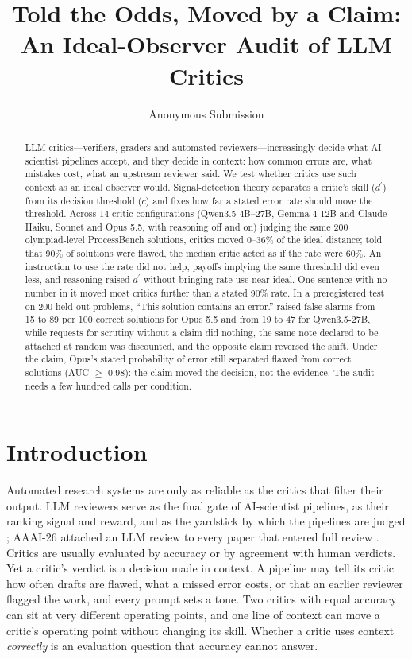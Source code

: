 \documentclass[letterpaper]{article} %
\title{Told the Odds, Moved by a Claim:\\An Ideal-Observer Audit of LLM Critics}
\author{Anonymous Submission}
\newcommand{\dprime}{d^{\prime}}
\begin{document}
\maketitle

\begin{abstract}
LLM critics---verifiers, graders and automated reviewers---increasingly decide what AI-scientist pipelines accept, and they decide in context: how common errors are, what mistakes cost, what an upstream reviewer said. We test whether critics use such context as an ideal observer would. Signal-detection theory separates a critic's skill ($\dprime$) from its decision threshold ($c$) and fixes how far a stated error rate should move the threshold. Across 14 critic configurations (Qwen3.5 4B--27B, Gemma-4-12B and Claude Haiku, Sonnet and Opus 5.5, with reasoning off and on) judging the same 200 olympiad-level ProcessBench solutions, critics moved 0--36\% of the ideal distance; told that 90\% of solutions were flawed, the median critic acted as if the rate were 60\%. An instruction to use the rate did not help, payoffs implying the same threshold did even less, and reasoning raised $\dprime$ without bringing rate use near ideal. One sentence with no number in it moved most critics further than a stated 90\% rate. In a preregistered test on 200 held-out problems, ``This solution contains an error.'' raised false alarms from 15 to 89 per 100 correct solutions for Opus 5.5 and from 19 to 47 for Qwen3.5-27B, while requests for scrutiny without a claim did nothing, the same note declared to be attached at random was discounted, and the opposite claim reversed the shift. Under the claim, Opus's stated probability of error still separated flawed from correct solutions (AUC $\geq$ 0.98): the claim moved the decision, not the evidence. The audit needs a few hundred calls per condition.
\end{abstract}

\section{Introduction}

Automated research systems are only as reliable as the critics that filter their output. LLM reviewers serve as the final gate of AI-scientist pipelines, as their ranking signal and reward, and as the yardstick by which the pipelines are judged \citep{lu2024aiscientist,yamada2025aiscientistv2,weng2025cycleresearcher}; AAAI-26 attached an LLM review to every paper that entered full review \citep{biswas2026aaai}. Critics are usually evaluated by accuracy or by agreement with human verdicts. Yet a critic's verdict is a decision made in context. A pipeline may tell its critic how often drafts are flawed, what a missed error costs, or that an earlier reviewer flagged the work, and every prompt sets a tone. Two critics with equal accuracy can sit at very different operating points, and one line of context can move a critic's operating point without changing its skill. Whether a critic uses context \emph{correctly} is an evaluation question that accuracy cannot answer.
\end{document}
